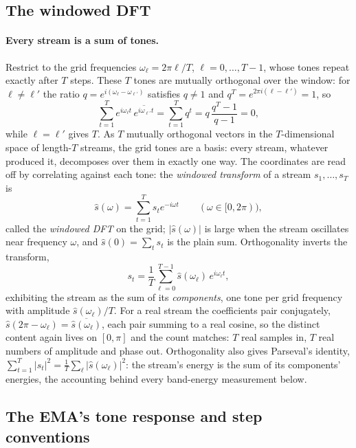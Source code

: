 \documentclass[11pt,a4paper]{article}
\theoremstyle{remark}
\begin{document}
\subsection{The windowed DFT}
\label{sec:dft}

\paragraph{Every stream is a sum of tones.} Restrict to the grid frequencies $\omega_\ell=2\pi\ell/T$, $\ell=0,\dots,T-1$, whose tones repeat exactly after $T$ steps.
These $T$ tones are mutually orthogonal over the window: for $\ell\ne\ell'$ the ratio $q=e^{i(\omega_\ell-\omega_{\ell'})}$ satisfies $q\ne1$ and $q^{T}=e^{2\pi i(\ell-\ell')}=1$, so
\[
\sum_{t=1}^{T}e^{i\omega_\ell t}\,\overline{e^{i\omega_{\ell'} t}}
=\sum_{t=1}^{T}q^{t}=q\,\frac{q^{T}-1}{q-1}=0,
\]
while $\ell=\ell'$ gives $T$.
As $T$ mutually orthogonal vectors in the $T$-dimensional space of length-$T$ streams, the grid tones are a basis: every stream, whatever produced it, decomposes over them in exactly one way.
The coordinates are read off by correlating against each tone: the \emph{windowed transform} of a stream $s_1,\dots,s_T$ is
\[
\hat s(\omega)=\sum_{t=1}^{T}s_t e^{-i\omega t}\qquad(\omega\in[0,2\pi)),
\]
called the \emph{windowed DFT} on the grid; $\lvert\hat s(\omega)\rvert$ is large when the stream oscillates near frequency $\omega$, and $\hat s(0)=\sum_t s_t$ is the plain sum.
Orthogonality inverts the transform,
\begin{equation}
\label{eq:invdft}
s_t=\frac1T\sum_{\ell=0}^{T-1}\hat s(\omega_\ell)\,e^{i\omega_\ell t},
\end{equation}
exhibiting the stream as the sum of its \emph{components}, one tone per grid frequency with amplitude $\hat s(\omega_\ell)/T$.
For a real stream the coefficients pair conjugately, $\hat s(2\pi-\omega_\ell)=\overline{\hat s(\omega_\ell)}$, each pair summing to a real cosine, so the distinct content again lives on $[0,\pi]$ and the count matches: $T$ real samples in, $T$ real numbers of amplitude and phase out.
Orthogonality also gives Parseval's identity, $\sum_{t=1}^{T}\lvert s_t\rvert^{2}=\tfrac1T\sum_{\ell}\lvert\hat s(\omega_\ell)\rvert^{2}$: the stream's energy is the sum of its components' energies, the accounting behind every band-energy measurement below.

\subsection{The EMA's tone response and step conventions}
\label{sec:ema}
\end{document}

